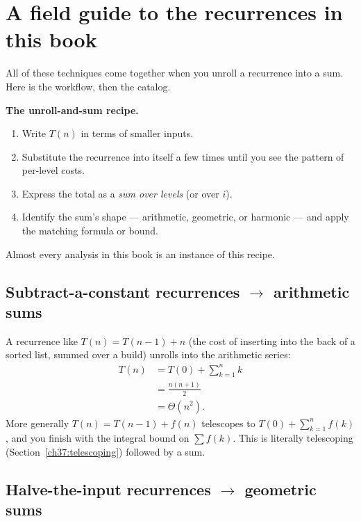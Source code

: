 \section{A field guide to the recurrences in this book}
\label{ch37:recurrences}

All of these techniques come together when you unroll a recurrence into a sum. Here
is the workflow, then the catalog.

\begin{labbox}
\textbf{The unroll-and-sum recipe.}
\begin{enumerate}
  \item Write $T(n)$ in terms of smaller inputs.
  \item Substitute the recurrence into itself a few times until you see the
        pattern of per-level costs.
  \item Express the total as a \emph{sum over levels} (or over $i$).
  \item Identify the sum's shape --- arithmetic, geometric, or harmonic --- and
        apply the matching formula or bound.
\end{enumerate}
Almost every analysis in this book is an instance of this recipe.
\end{labbox}

\subsection{Subtract-a-constant recurrences \texorpdfstring{$\to$}{lead to} arithmetic sums}

A recurrence like $T(n) = T(n-1) + n$ (the cost of inserting into the back of a
sorted list, summed over a build) unrolls into the arithmetic series:
\begin{align*}
  T(n) &= T(0) + \sum_{k=1}^{n} k \\
       &= \frac{n(n+1)}{2} \\
       &= \Theta(n^2).
\end{align*}
More generally $T(n) = T(n-1) + f(n)$ telescopes to $T(0) + \sum_{k=1}^{n} f(k)$,
and you finish with the integral bound on $\sum f(k)$. This is literally
telescoping (Section~\ref{ch37:telescoping}) followed by a sum.

\subsection{Halve-the-input recurrences \texorpdfstring{$\to$}{lead to} geometric sums}

